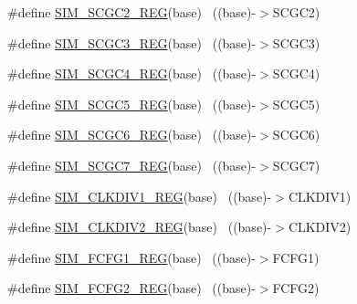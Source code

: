 \begin{DoxyCompactItemize}
\item 
\#define \hyperlink{group___s_i_m___register___accessor___macros_gae8d94cd7e3f87001db2cef56ef232ab3}{S\+I\+M\+\_\+\+S\+C\+G\+C2\+\_\+\+R\+EG}(base)                                        ~((base)-\/$>$S\+C\+G\+C2)
\item 
\#define \hyperlink{group___s_i_m___register___accessor___macros_ga4aa72db302e92ef6729659169881dc61}{S\+I\+M\+\_\+\+S\+C\+G\+C3\+\_\+\+R\+EG}(base)                                        ~((base)-\/$>$S\+C\+G\+C3)
\item 
\#define \hyperlink{group___s_i_m___register___accessor___macros_gab863740854e0a595d5d450e533ded630}{S\+I\+M\+\_\+\+S\+C\+G\+C4\+\_\+\+R\+EG}(base)                                        ~((base)-\/$>$S\+C\+G\+C4)
\item 
\#define \hyperlink{group___s_i_m___register___accessor___macros_gaf51026d4b580eca5948ae938148192e9}{S\+I\+M\+\_\+\+S\+C\+G\+C5\+\_\+\+R\+EG}(base)                                        ~((base)-\/$>$S\+C\+G\+C5)
\item 
\#define \hyperlink{group___s_i_m___register___accessor___macros_ga0d700471b59fa17a37db41eea9ac34d4}{S\+I\+M\+\_\+\+S\+C\+G\+C6\+\_\+\+R\+EG}(base)                                        ~((base)-\/$>$S\+C\+G\+C6)
\item 
\#define \hyperlink{group___s_i_m___register___accessor___macros_ga8524b7aa144aa516fbbc9ac2da38c7b0}{S\+I\+M\+\_\+\+S\+C\+G\+C7\+\_\+\+R\+EG}(base)                                        ~((base)-\/$>$S\+C\+G\+C7)
\item 
\#define \hyperlink{group___s_i_m___register___accessor___macros_ga9a2e39cdabbfa7d094a5442016be4dd0}{S\+I\+M\+\_\+\+C\+L\+K\+D\+I\+V1\+\_\+\+R\+EG}(base)                                    ~((base)-\/$>$C\+L\+K\+D\+I\+V1)
\item 
\#define \hyperlink{group___s_i_m___register___accessor___macros_gaddf08644ec398256d25e6106daad245b}{S\+I\+M\+\_\+\+C\+L\+K\+D\+I\+V2\+\_\+\+R\+EG}(base)                                    ~((base)-\/$>$C\+L\+K\+D\+I\+V2)
\item 
\#define \hyperlink{group___s_i_m___register___accessor___macros_ga6cc80fd9f1edfd8f709d2c8fe3c97080}{S\+I\+M\+\_\+\+F\+C\+F\+G1\+\_\+\+R\+EG}(base)                                        ~((base)-\/$>$F\+C\+F\+G1)
\item 
\#define \hyperlink{group___s_i_m___register___accessor___macros_ga8e1caad19971280346dc9c767c8f4b6e}{S\+I\+M\+\_\+\+F\+C\+F\+G2\+\_\+\+R\+EG}(base)                                        ~((base)-\/$>$F\+C\+F\+G2)

\end{DoxyCompactItemize}
